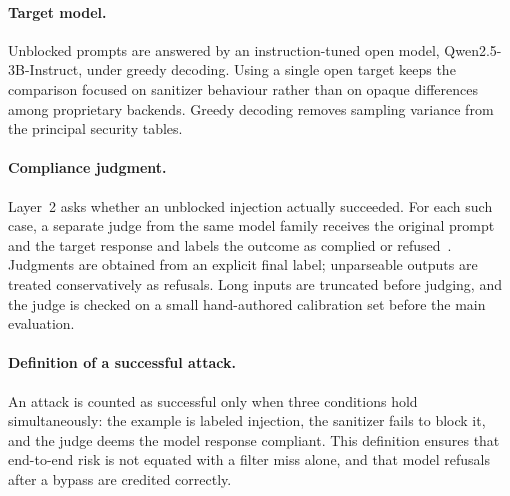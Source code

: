 \documentclass{article}
\begin{document}
\paragraph{Target model.}
Unblocked prompts are answered by an instruction-tuned open model, Qwen2.5-3B-Instruct, under greedy decoding.
Using a single open target keeps the comparison focused on sanitizer behaviour rather than on opaque differences among proprietary backends.
Greedy decoding removes sampling variance from the principal security tables.

\paragraph{Compliance judgment.}
Layer~2 asks whether an unblocked injection actually succeeded.
For each such case, a separate judge from the same model family receives the original prompt and the target response and labels the outcome as complied or refused~\cite{zizzo2025adversarial,yi2024jailbreak}.
Judgments are obtained from an explicit final label; unparseable outputs are treated conservatively as refusals.
Long inputs are truncated before judging, and the judge is checked on a small hand-authored calibration set before the main evaluation.

\paragraph{Definition of a successful attack.}
An attack is counted as successful only when three conditions hold simultaneously: the example is labeled injection, the sanitizer fails to block it, and the judge deems the model response compliant.
This definition ensures that end-to-end risk is not equated with a filter miss alone, and that model refusals after a bypass are credited correctly.
\end{document}
